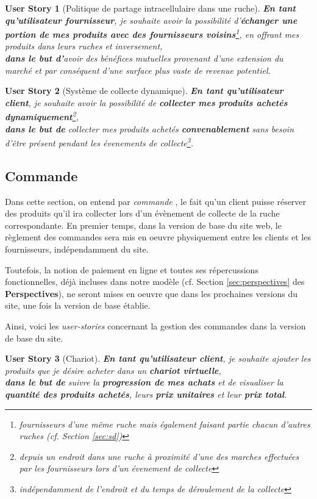\documentclass[a4paper,12pt]{report}
\theoremstyle{break}
\newtheorem*{userStory}{User Story}
\theoremstyle{break}
\theoremstyle{break}
\theoremstyle{break}
\theoremstyle{definition}
\theoremstyle{remark}
\begin{document}
\begin{userStory}[Politique de partage intracellulaire dans une ruche]
\textbf{En tant qu'utilisateur {\color{red}fournisseur}}, je souhaite avoir la possibilité d'\textbf{échanger une portion de mes produits avec des fournisseurs voisins}\footnote{fournisseurs d'une même ruche mais également faisant partie chacun d'autres ruches (cf. Section \ref{sec:sd})}, en offrant mes produits dans leurs ruches et inversement,\\
\indent
\textbf{dans le but d'}avoir des bénéfices mutuelles provenant d'une extension du marché et par conséquent d'une surface plus vaste de revenue potentiel.
\end{userStory}

\begin{userStory}[Système de collecte dynamique]
\textbf{En tant qu'utilisateur {\color{green}client}}, je souhaite avoir la possibilité de \textbf{collecter mes produits achetés dynamiquement}\footnote{depuis un endroit dans une ruche à proximité d'une des marches effectuées par les fournisseurs lors d'un évenement de collecte},\\
\indent
\textbf{dans le but de} collecter mes produits achetés \textbf{convenablement} sans besoin d'être présent pendant les évenements de collecte\footnote{indépendamment de l'endroit et du temps de déroulement de la collecte}.
\end{userStory}

\subsection{Commande}
Dans cette section, on entend par \og \textit{commande} \fg , le fait qu'un client puisse réserver des produits qu'il ira collecter lors d'un évènement de collecte de la ruche correspondante. En premier temps, dans la version de base du site web, le règlement des commandes sera mis en oeuvre physiquement entre les clients et les fournisseurs, indépendamment du site.

Toutefois, la notion de paiement en ligne et toutes ses répercussions fonctionnelles, déjà incluses dans notre modèle (cf. Section \ref{sec:perspectives} des \textbf{Perspectives}), ne seront mises en oeuvre que dans les prochaines versions du site, une fois la version de base établie.

Ainsi, voici les \textit{user-stories} concernant la gestion des commandes dans la version de base du site.

\begin{userStory}[Chariot]
\textbf{En tant qu'utilisateur {\color{green}client}}, je souhaite ajouter les produits que je désire acheter dans un \textbf{chariot virtuelle},\\
\indent
\textbf{dans le but de} suivre la \textbf{progression de mes achats} et de visualiser la \textbf{quantité des produits achetés}, leurs \textbf{prix unitaires} et leur \textbf{prix total}.
\end{userStory}
\end{document}
